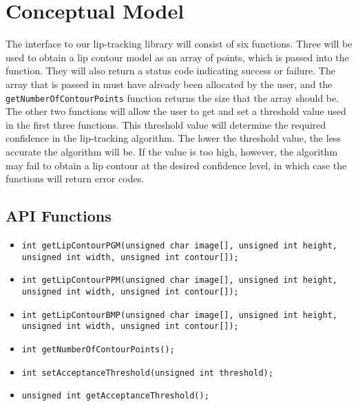 \chapter{Conceptual Model}

The interface to our lip-tracking library will consist of six functions. Three will be used to obtain a lip contour model as an array of points, which is passed into the function. They will also return a status code indicating success or failure. The array that is passed in must have already been allocated by the user, and the \texttt{getNumberOfContourPoints} function returns the size that the array should be. The other two functions will allow the user to get and set a threshold value used in the first three functions. This threshold value will determine the required confidence in the lip-tracking algorithm. The lower the threshold value, the less accurate the algorithm will be. If the value is too high, however, the algorithm may fail to obtain a lip contour at the desired confidence level, in which case the functions will return error codes.

\section{API Functions}
\begin{itemize}
\item \texttt{int getLipContourPGM(unsigned char image[], unsigned int height, unsigned int width, unsigned int contour[]);}
\item \texttt{int getLipContourPPM(unsigned char image[], unsigned int height, unsigned int width, unsigned int contour[]);}
\item \texttt{int getLipContourBMP(unsigned char image[], unsigned int height, unsigned int width, unsigned int contour[]);}
\item \texttt{int getNumberOfContourPoints();}
\item \texttt{int setAcceptanceThreshold(unsigned int threshold);}
\item \texttt{unsigned int getAcceptanceThreshold();}
\end{itemize}